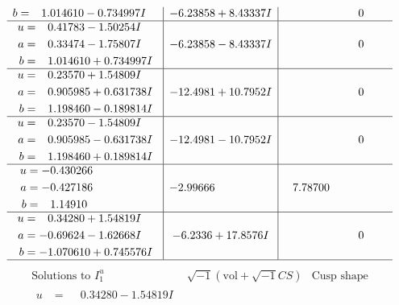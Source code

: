 \documentclass[1p]{elsarticle_modified}
\theoremstyle{definition}
\newcommand{\I}{\sqrt{-1}}
\begin{document}
$$\begin{array}{c|c|c}
\begin{aligned}
b &= \phantom{-}1.014610 - 0.734997 I\end{aligned}
 & -6.23858 + 8.43337 I & \phantom{-0.000000 } 0 \\ \hline\begin{aligned}
u &= \phantom{-}0.41783 - 1.50254 I \\
a &= \phantom{-}0.33474 - 1.75807 I \\
b &= \phantom{-}1.014610 + 0.734997 I\end{aligned}
 & -6.23858 - 8.43337 I & \phantom{-0.000000 } 0 \\ \hline\begin{aligned}
u &= \phantom{-}0.23570 + 1.54809 I \\
a &= \phantom{-}0.905985 + 0.631738 I \\
b &= \phantom{-}1.198460 - 0.189814 I\end{aligned}
 & -12.4981 + 10.7952 I & \phantom{-0.000000 } 0 \\ \hline\begin{aligned}
u &= \phantom{-}0.23570 - 1.54809 I \\
a &= \phantom{-}0.905985 - 0.631738 I \\
b &= \phantom{-}1.198460 + 0.189814 I\end{aligned}
 & -12.4981 - 10.7952 I & \phantom{-0.000000 } 0 \\ \hline\begin{aligned}
u &= -0.430266\phantom{ +0.000000I} \\
a &= -0.427186\phantom{ +0.000000I} \\
b &= \phantom{-}1.14910\phantom{ +0.000000I}\end{aligned}
 & -2.99666\phantom{ +0.000000I} & \phantom{-}7.78700\phantom{ +0.000000I} \\ \hline\begin{aligned}
u &= \phantom{-}0.34280 + 1.54819 I \\
a &= -0.69624 - 1.62668 I \\
b &= -1.070610 + 0.745576 I\end{aligned}
 & -6.2336 + 17.8576 I & \phantom{-0.000000 } 0\\
 \hline 
 \end{array}$$\newpage$$\begin{array}{c|c|c}  
\text{Solutions to }I^u_{1}& \I (\text{vol} + \sqrt{-1}CS) & \text{Cusp shape}\\
 \hline 
\begin{aligned}
u &= \phantom{-}0.34280 - 1.54819 I \\

\end{aligned}
\end{array}$$
\end{document}
